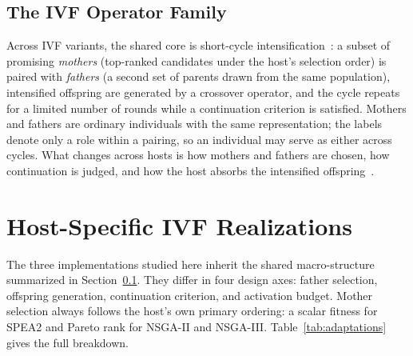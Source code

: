 \documentclass[runningheads]{llncs}
\begin{document}
\subsection{The IVF Operator Family}
\label{sec:ivf_family}

Across IVF variants, the shared core is short-cycle intensification~\cite{camilo-junior2011}: a subset of promising \emph{mothers} (top-ranked candidates under the host's selection order) is paired with \emph{fathers} (a second set of parents drawn from the same population), intensified offspring are generated by a crossover operator, and the cycle repeats for a limited number of rounds while a continuation criterion is satisfied. Mothers and fathers are ordinary individuals with the same representation; the labels denote only a role within a pairing, so an individual may serve as either across cycles. What changes across hosts is how mothers and fathers are chosen, how continuation is judged, and how the host absorbs the intensified offspring~\cite{sampaio2017ivf,sampaio2019ivf,Sampaio2024,zambrano2026ivfspea2}.

\section{Host-Specific IVF Realizations}
\label{sec:adaptations}

The three implementations studied here inherit the shared macro-structure summarized in Section~\ref{sec:ivf_family}. They differ in four design axes: father selection, offspring generation, continuation criterion, and activation budget. Mother selection always follows the host's own primary ordering: a scalar fitness for SPEA2 and Pareto rank for NSGA-II and NSGA-III. Table~\ref{tab:adaptations} gives the full breakdown.
\end{document}
